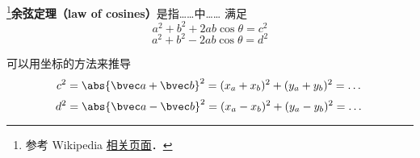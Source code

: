 
\begin{issues}
\issueDraft
\end{issues}

\footnote{参考 Wikipedia \href{https://en.wikipedia.org/wiki/Law_of_cosines}{相关页面}．}\textbf{余弦定理（law of cosines）}是指……中…… 满足
\begin{equation}\label{CosThe_eq1}
a^2 + b^2 + 2ab\cos\theta = c^2
\end{equation}
\begin{equation}
a^2 + b^2 - 2ab\cos\theta = d^2
\end{equation}



可以用坐标的方法来推导
\begin{equation}
c^2 = \abs{\bvec a + \bvec b}^2 = (x_a + x_b)^2 + (y_a + y_b)^2 = \dots
\end{equation}
\begin{equation}
d^2 = \abs{\bvec a - \bvec b}^2 = (x_a - x_b)^2 + (y_a - y_b)^2 = \dots
\end{equation}
